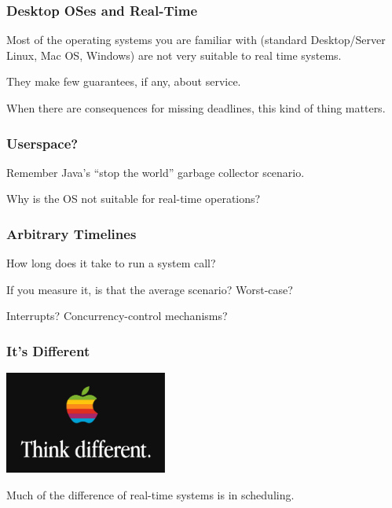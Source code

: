 \begin{frame}
\frametitle{Desktop OSes and Real-Time}

Most of the operating systems you are familiar with (standard Desktop/Server Linux, Mac OS, Windows) are not very suitable to real time systems. 

They make few guarantees, if any, about service. 

When there are consequences for missing deadlines, this kind of thing matters. 

\end{frame}


\begin{frame}
\frametitle{Userspace?}

Remember Java's ``stop the world'' garbage collector scenario.

Why is the OS not suitable for real-time operations?

\end{frame}

\begin{frame}
\frametitle{Arbitrary Timelines}

How long does it take to run a system call?

If you measure it, is that the average scenario? Worst-case?

Interrupts? Concurrency-control mechanisms?

\end{frame}

\begin{frame}
\frametitle{It's Different}

\begin{center}
	\includegraphics[width=0.4\textwidth]{images/thinkdifferent.png}
\end{center}

Much of the difference of real-time systems is in scheduling.

\end{frame}

